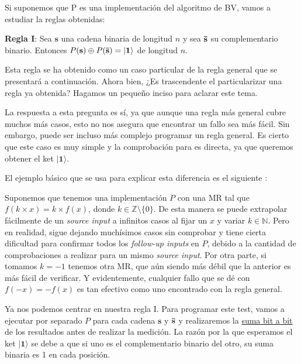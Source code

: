  Si suponemos que P es una implementación del algoritmo de BV, vamos a estudiar la reglas obtenidas: \newline

 \textbf{Regla I}\label{R:BV:1}: Sea $\mathbf{s}$ una cadena binaria de longitud $n$ y sea $\mathbf{\Bar{s}}$ su complementario binario. Entonces $P(\mathbf{s})\oplus P(\mathbf{\Bar{s}})=|\mathbf{1}\rangle$ de longitud $n$.\newline

 Esta regla se ha obtenido como un caso particular de la regla general que se presentará a continuación. Ahora bien, ¿Es trascendente el particularizar una regla ya obtenida? Hagamos un pequeño inciso para aclarar este tema.\newline

 La respuesta a esta pregunta es sí, ya que aunque una regla más general cubre muchos más casos, esto no nos asegura que encontrar un fallo sea más fácil. Sin embargo, puede ser incluso más complejo programar un regla general. Es cierto que este caso es muy simple y la comprobación para es directa, ya que queremos obtener el ket $|\mathbf{1}\rangle$. \newline

 El ejemplo básico que se usa para explicar esta diferencia es el siguiente \cite{AR:MTmain:2008}:\newline

Suponemos que tenemos una implementación $P$ con una MR tal que $f(k\times x)=k\times f(x)$, donde $k \in \mathbb{Z} \setminus \{0\}$. De esta manera se puede extrapolar fácilmente de un \textit{source input} a infinitos casos al fijar un $x$ y variar $k \in \mathbb{N}$. Pero en realidad, sigue dejando muchísimos casos sin comprobar y tiene cierta dificultad para confirmar todos los \textit{follow-up inputs} en $P$, debido a la cantidad de comprobaciones a realizar para un mismo \textit{source input}. Por otra parte, si tomamos $k=-1$ tenemos otra MR, que aún siendo más débil que la anterior es más fácil de verificar. Y evidentemente, cualquier fallo que se dé con $f(-x)=-f(x)$ es tan efectivo como uno encontrado con la regla general.\newline

Ya nos podemos centrar en nuestra regla I. Para programar este test, vamos a ejecutar por separado $P$ para cada cadena $\mathbf{s}$ y $\mathbf{\Bar{s}}$ y realizaremos la \hyperref[Sec3.1:Suma]{suma bit a bit} de los resultados antes de realizar la medición. La razón por la que esperamos el ket $|\mathbf{1}\rangle$ se debe a que si uno es el complementario binario del otro, su suma binaria es 1 en cada posición.\newline

